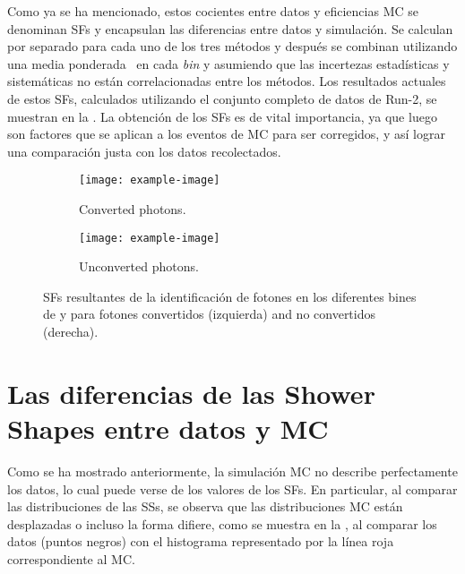 Como ya se ha mencionado, estos cocientes entre datos y eficiencias \ac{MC} se denominan \acp{SF} y encapsulan las diferencias entre datos y simulación. Se calculan por separado para cada uno de los tres métodos y después se combinan utilizando una media ponderada~\cite{BLUEMethod} en cada \textit{bin} y asumiendo que las incertezas estadísticas y sistemáticas no están correlacionadas entre los métodos. Los resultados actuales de estos \acp{SF}, calculados utilizando el conjunto completo de datos de Run-2, se muestran en la \Fig{\ref{fig:pid_ss:pid:efficiencies:sfs}}. La obtenci\'on de los \acp{SF} es de vital importancia, ya que luego son factores que se aplican a los eventos de \ac{MC} para ser corregidos, y as\'i lograr una comparaci\'on justa con los datos recolectados.

\begin{figure}[ht!]
    \centering
    \begin{subfigure}[h]{0.49\linewidth}
        \centering
        \texttt{[image: example-image]}
        \caption{Converted photons.}
    \end{subfigure}
    \hfill
    \begin{subfigure}[h]{0.49\linewidth}
        \centering
        \texttt{[image: example-image]}
        \caption{Unconverted photons.}
    \end{subfigure}
    \caption{\acp{SF} resultantes de la identificaci\'on de fotones en los diferentes bines de \pt y \abseta para fotones convertidos (izquierda) and no convertidos (derecha). }
    \label{fig:pid_ss:pid:efficiencies:sfs}
\end{figure}


\section{Las diferencias de las Shower Shapes entre datos y MC}
\label{sec:pid_ss:ss_differences}


Como se ha mostrado anteriormente, la simulación \ac{MC} no describe perfectamente los datos, lo cual puede verse de los valores de los \acp{SF}. En particular, al comparar las distribuciones de las \acp{SS}, se observa que las distribuciones \ac{MC} están desplazadas o incluso la forma difiere, como se muestra en la \Fig{\ref{fig:pid_ss:ss_differences:ss}}, al comparar los datos (puntos negros) con el histograma representado por la línea roja correspondiente al \ac{MC}.

